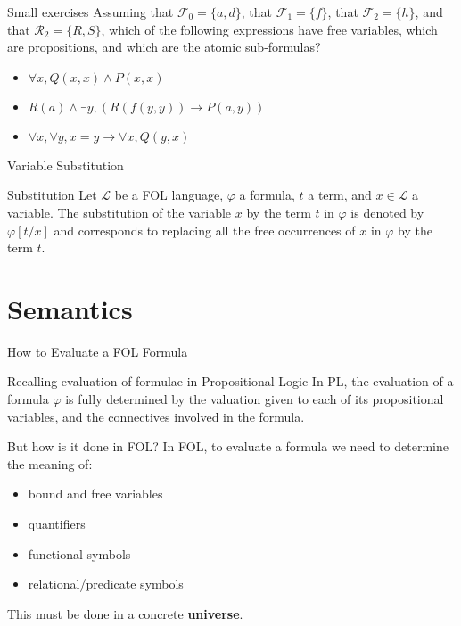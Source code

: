 \documentclass[aspectratio=169]{beamer}
\begin{document}
\begin{slide}{Small exercises}
Assuming that $\mathcal{F}_0 = \{a,d\}$, that $\mathcal{F}_1 = \{f\}$, that $\mathcal{F}_2 = \{h\}$, and that $\mathcal{R}_2 = \{R,S\}$, which of the following expressions have free variables, which are propositions, and which are the atomic sub-formulas?
\begin{itemize}
\item $\forall x, Q(x,x) \land P(x,x)$ 
\item $R(a) \land \exists y, (R(f(y,y)) \to P(a,y))$
\item $\forall x,\forall y, x = y \to \forall x, Q(y,x)$
\end{itemize}

\end{slide}


\begin{slide}{Variable Substitution}

\begin{block}{Substitution}
Let $\mathcal{L}$ be a FOL language, $\varphi$ a formula, $t$ a term, and $x \in \mathcal{L}$ a variable. The substitution of the variable $x$ by the term $t$ in $\varphi$ is denoted by $\varphi[t/x]$ and corresponds to replacing all the free occurrences of $x$ in $\varphi$ by the term $t$.
\end{block}

\end{slide}


\section*{Semantics}

\begin{slide}{How to Evaluate a FOL Formula}
  \begin{block}{Recalling evaluation of formulae in Propositional Logic}
  In PL, the evaluation of a formula $\varphi$ is fully determined by the valuation given to each of its propositional variables, and the connectives involved in the formula.  
  \end{block}
  
  \begin{block}{But how is it done in FOL?}
  In FOL, to evaluate a formula we need to determine the meaning of:
    \begin{itemize}
    \item bound and free variables
    \item quantifiers
    \item functional symbols
    \item relational/predicate symbols
    \end{itemize}
    This must be done in a concrete {\bf universe}.
  \end{block}
\end{slide}
\end{document}
